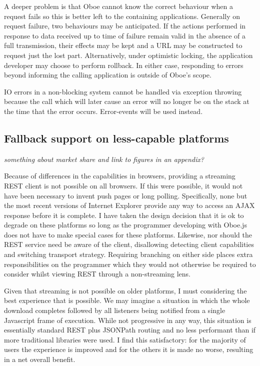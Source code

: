 \documentclass[]{article}
\begin{document}
A deeper problem is that Oboe cannot know the correct behaviour when a
request fails so this is better left to the containing applications.
Generally on request failure, two behaviours may be anticipated. If the
actions performed in response to data received up to time of failure
remain valid in the absence of a full transmission, their effects may be
kept and a URL may be constructed to request just the lost part.
Alternatively, under optimistic locking, the application developer may
choose to perform rollback. In either case, responding to errors beyond
informing the calling application is outside of Oboe's scope.

IO errors in a non-blocking system cannot be handled via exception
throwing because the call which will later cause an error will no longer
be on the stack at the time that the error occurs. Error-events will be
used instead.

\subsection{Fallback support on less-capable platforms}

\emph{something about market share and link to figures in an appendix?}

Because of differences in the capabilities in browsers, providing a
streaming REST client is not possible on all browsers. If this were
possible, it would not have been necessary to invent push pages or long
polling. Specifically, none but the most recent versions of Internet
Explorer provide any way to access an AJAX response before it is
complete. I have taken the design decision that it is ok to degrade on
these platforms so long as the programmer developing with Oboe.js does
not have to make special cases for these platforms. Likewise, nor should
the REST service need be aware of the client, disallowing detecting
client capabilities and switching transport strategy. Requiring
branching on either side places extra responsibilities on the programmer
which they would not otherwise be required to consider whilst viewing
REST through a non-streaming lens.

Given that streaming is not possible on older platforms, I must
considering the best experience that is possible. We may imagine a
situation in which the whole download completes followed by all
listeners being notified from a single Javascript frame of execution.
While not progressive in any way, this situation is essentially standard
REST plus JSONPath routing and no less performant than if more
traditional libraries were used. I find this satisfactory: for the
majority of users the experience is improved and for the others it is
made no worse, resulting in a net overall benefit.
\end{document}
